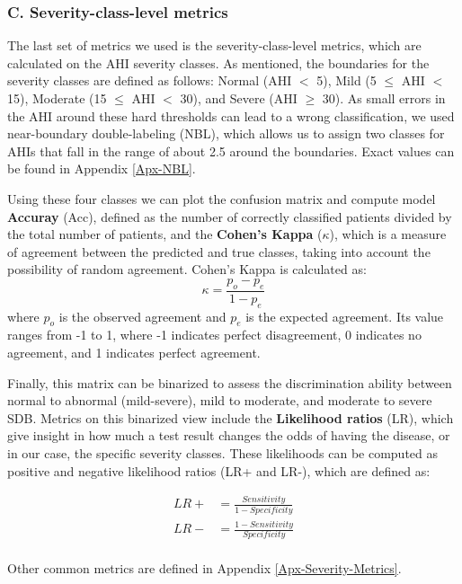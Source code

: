 \subsubsection*{C. Severity-class-level metrics}

The last set of metrics we used is the severity-class-level metrics, which are calculated on the AHI severity classes. As mentioned, the boundaries for the severity classes are defined as follows: Normal (AHI $<$ 5), Mild (5 $\le$ AHI $<$ 15), Moderate (15 $\le$ AHI $<$ 30), and Severe (AHI $\ge$ 30). As small errors in the AHI around these hard thresholds can lead to a wrong classification, we used near-boundary double-labeling (NBL), which allows us to assign two classes for AHIs that fall in the range of about 2.5 around the boundaries. Exact values can be found in Appendix \ref{Apx-NBL}.

Using these four classes we can plot the confusion matrix and compute model \textbf{Accuray} (Acc), defined as the number of correctly classified patients divided by the total number of patients, and the \textbf{Cohen's Kappa} ($\kappa$), which is a measure of agreement between the predicted and true classes, taking into account the possibility of random agreement. Cohen's Kappa is calculated as:
\begin{equation}
    \kappa = \frac{p_o - p_e}{1 - p_e}
\end{equation}
where $p_o$ is the observed agreement and $p_e$ is the expected agreement. Its value ranges from -1 to 1, where -1 indicates perfect disagreement, 0 indicates no agreement, and 1 indicates perfect agreement.

Finally, this matrix can be binarized to assess the discrimination ability between normal to abnormal (mild-severe), mild to moderate, and moderate to severe SDB.
Metrics on this binarized view include the \textbf{Likelihood ratios} (LR), which give insight in how much a test result changes the odds of having the disease, or in our case, the specific severity classes. These likelihoods can be computed as positive and negative likelihood ratios (LR+ and LR-), which are defined as:

\begin{align}
    LR+ &= \frac{Sensitivity}{1-Specificity} \\
    LR- &= \frac{1-Sensitivity}{Specificity} \\
\end{align}

Other common metrics are defined in Appendix \ref{Apx-Severity-Metrics}.